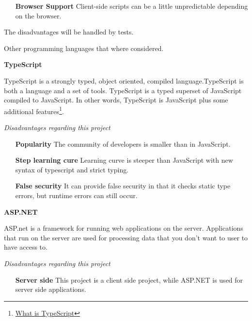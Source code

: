 \begin{itemize}
\item [\textbf{Browser Support}] Client-side scripts can be a little unpredictable depending on the browser.
\end{itemize}

The disadvantages will be handled by tests.

\newpage
\centerline{Other programming languages that where considered.}

\bigskip

\centerline{\textbf{TypeScript}}

TypeScript is a strongly typed, object oriented, compiled language.TypeScript  is both a language and a set of tools. TypeScript is a typed superset of JavaScript compiled to JavaScript. In other words, TypeScript is JavaScript plus some additional features\footnote{\href{https://www.tutorialspoint.com/typescript/typescript_overview}{What is TypeScript}\label{whatIsTypeScript?}}.

\centerline{\textit{Disadvantages regarding this project}}
\begin{itemize}
\item [\textbf{Popularity}] The community of developers is smaller than in JavaScript. 
\item [\textbf{Step learning cure}] Learning curve is steeper than JavaScript with new syntax of typescript and strict typing.
\item [\textbf{False security}] It can provide false security in that it checks static type errors, but runtime errors can still occur.
\end{itemize}

\medskip

\centerline{\textbf{ASP.NET}}

ASP.net is a framework for running web applications on the server. Applications that run on the server are used for processing data that you don't want to user to have access to.

\medskip
\centerline{\textit{Disadvantages regarding this project}}

\begin{itemize}
\item [\textbf{Server side}] This project is a client side project, while ASP.NET is used for server side applications. 
\end{itemize}







